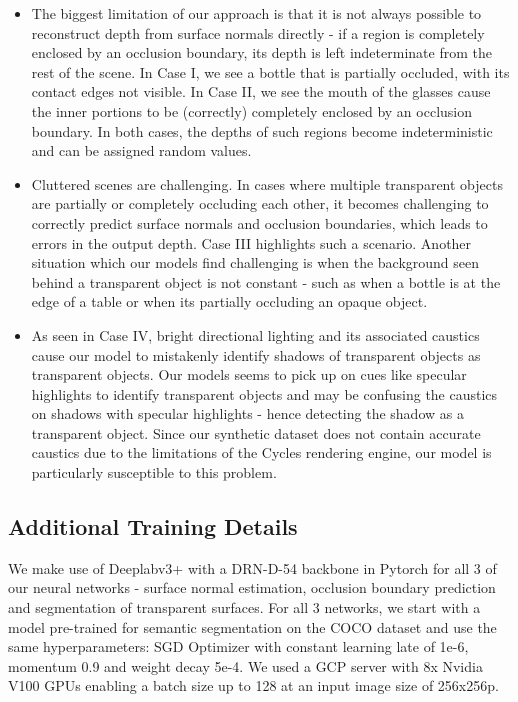 \documentclass[letterpaper, 10 pt, conference]{ieeeconf}
\begin{document}
\begin{itemize}[leftmargin=*]
\item The biggest limitation of our approach is that it is not always possible to reconstruct depth from surface normals directly \cite{zhang2018deepdepth} - if a region is completely enclosed by an occlusion boundary, its depth is left indeterminate from the rest of the scene. In Case I, we see a bottle that is partially occluded, with its contact edges not visible. In Case II, we see the mouth of the glasses cause the inner portions to be (correctly) completely enclosed by an occlusion boundary. In both cases, the depths of such regions become indeterministic and can be assigned random values.

\item Cluttered scenes are challenging. In cases where multiple transparent objects are partially or completely occluding each other, it becomes challenging to correctly predict surface normals and occlusion boundaries, which leads to errors in the output depth. Case III highlights such a scenario. Another situation which our models find challenging is when the background seen behind a transparent object is not constant - such as when a bottle is at the edge of a table or when its partially occluding an opaque object.

\item As seen in Case IV, bright directional lighting and its associated caustics cause our model to mistakenly identify shadows of transparent objects as transparent objects. Our models seems to pick up on cues like specular highlights to identify transparent objects and may be confusing the caustics on shadows with specular highlights - hence detecting the shadow as a transparent object. Since our synthetic dataset does not contain accurate caustics due to the limitations of the Cycles rendering engine, our model is particularly susceptible to this problem.
\end{itemize}


\subsection{Additional Training Details}
We make use of Deeplabv3+ with a DRN-D-54 backbone \cite{deeplabv3plus} in Pytorch for all 3 of our neural networks - surface normal estimation, occlusion boundary prediction and segmentation of transparent surfaces. For all 3 networks, we start with a model pre-trained for semantic segmentation on the COCO dataset and use the same hyperparameters: SGD Optimizer with constant learning late of 1e-6, momentum 0.9 and weight decay 5e-4. We used a GCP server with 8x Nvidia V100 GPUs enabling a batch size up to 128 at an input image size of 256x256p.
\end{document}
